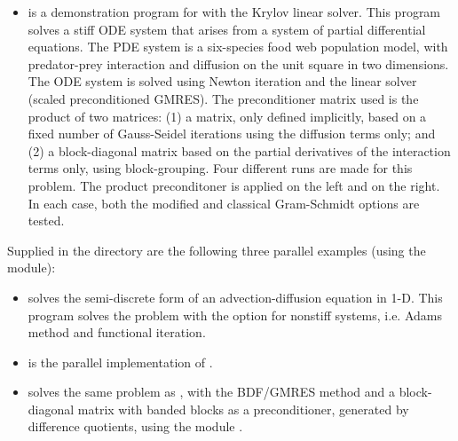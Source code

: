 \begin{itemize}
\item {}
  is a demonstration program for {\cvode} with the Krylov linear solver.
  \newline
  This program solves a stiff ODE system that arises from a system     
  of partial differential equations.  The PDE system is a six-species
  food web population model, with predator-prey interaction and diffusion 
  on the unit square in two dimensions.
  \newline
  The ODE system is solved using Newton iteration and the      
  {\cvspgmr} linear solver (scaled preconditioned GMRES).
  \newline
  The preconditioner matrix used is the product of two matrices:         
  (1) a matrix, only defined implicitly, based on a fixed number of     
  Gauss-Seidel iterations using the diffusion terms only; and               
  (2) a block-diagonal matrix based on the partial derivatives of the   
  interaction terms only, using block-grouping.                          
  \newline
  Four different runs are made for this problem.                        
  The product preconditoner is applied on the left and on the right.    
  In each case, both the modified and classical Gram-Schmidt options    
  are tested.
\end{itemize}

Supplied in the  directory are
the following three parallel examples (using the {\nvecp} module):
\begin{itemize}
\item {}
  solves the semi-discrete form of an advection-diffusion equation in 1-D.
  \newline
  This program solves the problem with the option for nonstiff systems,
  i.e. Adams method and functional iteration.
\item {}
  is the parallel implementation of .
\item {}
  solves the same problem as , with the BDF/GMRES method 
  and a block-diagonal matrix with banded blocks as a preconditioner, 
  generated by difference quotients, using the module {\cvbbdpre}.
\end{itemize}

